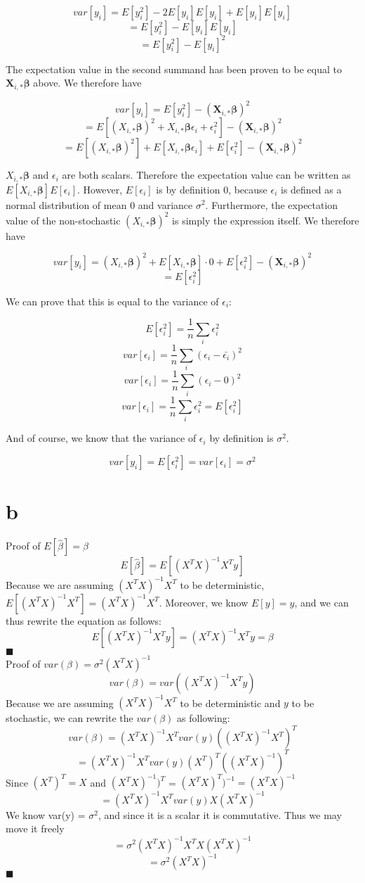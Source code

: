 \documentclass{article}
\begin{document}
\[ var[y_i] = E[y_i^2] - 2E[y_i]E[y_i] + E[y_i]E[y_i] \]
\[ = E[y_i^2] - E[y_i]E[y_i] \]
\[ = E[y_i^2] - E[y_i]^2 \]

The expectation value in the second summand has been proven to be equal 
to $\bm{X}_{i,*}\bm{\beta}$ above. We therefore have

\[ var[y_i] = E[y_i^2] - (\bm{X}_{i,*}\bm{\beta})^2 \]
\[ = E\left[(X_{i,*}\bm{\beta})^2 + X_{i,*}\bm{\beta}\epsilon_i + \epsilon_i^2\right] - (\bm{X}_{i,*}\bm{\beta})^2 \]
\[ = E\left[(X_{i,*}\bm{\beta})^2\right] + E[X_{i,*}\bm{\beta}\epsilon_i] + E[\epsilon_i^2] - (\bm{X}_{i,*}\bm{\beta})^2 \]

$X_{i,*}\bm{\beta}$ and $\epsilon_i$ are both scalars. Therefore the expectation value can be written as
$E[X_{i,*}\bm{\beta}]E[\epsilon_i]$. However, $E[\epsilon_i]$ is by definition $0$, because $\epsilon_i$ is
defined as a normal distribution of mean $0$ and variance $\sigma^2$. Furthermore, the expectation value of the
non-stochastic $(X_{i,*}\bm{\beta})^2$ is simply the expression itself. We therefore have

\[ var[y_i] = (X_{i,*}\bm{\beta})^2 + E[X_{i,*}\bm{\beta}]\cdot 0 + E[\epsilon_i^2] - (\bm{X}_{i,*}\bm{\beta})^2 \]
\[ = E[\epsilon_i^2] \]

We can prove that this is equal to the variance of $\epsilon_i$:

\[ E[\epsilon_i^2] = \frac{1}{n} \sum_i \epsilon_i^2\]
\[ var[\epsilon_i] = \frac{1}{n} \sum_i (\epsilon_i - \bar{\epsilon_i})^2\]
\[ var[\epsilon_i] = \frac{1}{n} \sum_i (\epsilon_i - 0)^2\]
\[ var[\epsilon_i] = \frac{1}{n} \sum_i \epsilon_i^2 = E[\epsilon_i^2] \]

And of course, we know that the variance of $\epsilon_i$ by definition is $\sigma^2$.

\[ var[y_i] = E[\epsilon_i^2] = var[\epsilon_i] = \sigma^2 \]

\section{b}

Proof of $E[\hat{\beta}] = \beta$
$$E[\hat{\beta}] = E[(X^{T}X)^{-1}X^{T}y]$$
Because we are assuming $(X^{T}X)^{-1}X^{T}$ to be deterministic, $E[(X^{T}X)^{-1}X^{T}] = (X^{T}X)^{-1}X^{T}$. Moreover, we know $E[y] = y$, and we can thus rewrite the equation as follows:
$$E[(X^{T}X)^{-1}X^{T}y] = (X^{T}X)^{-1}X^{T}y = \beta$$
$\blacksquare$
\\

Proof of $var(\beta) = \sigma^{2}(X^{T}X)^{-1}$
$$var(\beta) = var((X^{T}X)^{-1}X^{T}y)$$
Because we are assuming $(X^{T}X)^{-1}X^{T}$ to be deterministic and $y$ to be stochastic, we can rewrite the $var(\beta)$ as following:
$$var(\beta) = (X^{T}X)^{-1}X^{T}var(y)((X^{T}X)^{-1}X^{T})^{T}$$
$$ = (X^{T}X)^{-1}X^{T}var(y)(X^{T})^{T}((X^{T}X)^{-1})^{T}$$
Since $(X^{T})^{T} = X$ and $(X^{T}X)^{-1})^{T}$ = $(X^{T}X)^{T})^{-1} = (X^{T}X)^{-1}$
$$ = (X^{T}X)^{-1}X^{T}var(y)X(X^{T}X)^{-1} $$
We know var(y) = $\sigma^{2}$, and since it is a scalar it is commutative. Thus we may move it freely
$$ = \sigma^{2}(X^{T}X)^{-1}X^{T}X(X^{T}X)^{-1} $$
$$ = \sigma^{2}(X^{T}X)^{-1} $$
$\blacksquare$
\end{document}
